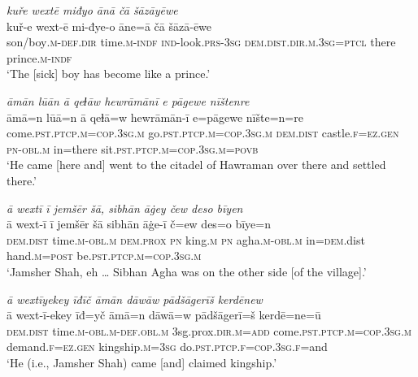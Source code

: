 \ea \label{DG.70}
\textit{kuře wextē miđyo ānā čā šāzāyēwe} \\ 
\gll kuř-e wext-ē mi-đye-o āne=ā čā šāzā-ēwe \\ 
 son/boy\textsc{.m}\textsc{-def}\textsc{.dir} time\textsc{.m}\textsc{-indf} \textsc{ind-}look\textsc{.prs}\textsc{-3sg} \textsc{dem.dist}\textsc{.dir}\textsc{.m}\textsc{.3sg}=\textsc{ptcl} there prince\textsc{.m}\textsc{-indf} \\ 
\glt `The [sick] boy has become like a prince.'
\z 
 
\ea \label{DP.9}
\textit{āmān lūān ā qeɫāw hewrāmānī e pāgewe nīštenre} \\ 
\gll āmā=n lūā=n ā qeɫā=w hewrāmān-ī e=pāgewe nīšte=n=re \\ 
 come\textsc{.pst}\textsc{.ptcp}\textsc{.m}\textsc{=cop}\textsc{.3sg}\textsc{.m} go\textsc{.pst}\textsc{.ptcp}\textsc{.m}\textsc{=cop}\textsc{.3sg}\textsc{.m} \textsc{dem.dist} castle\textsc{\textsc{.f}}\textsc{=ez}\textsc{.gen} \textsc{pn}\textsc{-obl}\textsc{.m} in=there sit\textsc{.pst}\textsc{.ptcp}\textsc{.m}\textsc{=cop}\textsc{.3sg}\textsc{.m}\textsc{=\textsc{povb}} \\ 
\glt `He came [here and] went to the citadel of Hawraman over there and settled there.'
\z 
 
\ea \label{DP.12}
\textit{ā wextī ī jemšēr šā, sibhān āġey čew deso bīyen} \\ 
\gll ā wext-ī ī jemšēr šā sibhān āġe-ī č=ew des=o bīye=n \\ 
 \textsc{dem.dist} time\textsc{.m}\textsc{-obl}\textsc{.m} \textsc{dem.prox} \textsc{pn} king\textsc{.m} \textsc{pn} agha\textsc{.m}\textsc{-obl}\textsc{.m} in\textsc{=dem}.dist hand\textsc{.m}\textsc{=\textsc{post}} be\textsc{.pst}\textsc{.ptcp}\textsc{.m}\textsc{=cop}\textsc{.3sg}\textsc{.m} \\ 
\glt `Jamsher Shah, eh … Sibhan Agha was on the other side [of the village].'
\z 
 
\ea \label{DP.17}
\textit{ā wextīyekey īđīč āmān dāwāw pādšāgerīš kerdēnew} \\ 
\gll ā wext-ī-ekey īđ=yč āmā=n dāwā=w pādšāgerī=š kerdē=ne=ū \\ 
 \textsc{dem.dist} time\textsc{.m}\textsc{-obl}\textsc{.m}\textsc{-def}\textsc{.obl}\textsc{.m} 3sg.prox\textsc{.dir}\textsc{.m}\textsc{=add} come\textsc{.pst}\textsc{.ptcp}\textsc{.m}\textsc{=cop}\textsc{.3sg}\textsc{.m} demand\textsc{\textsc{.f}}\textsc{=ez}\textsc{.gen} kingship\textsc{.m}\textsc{=3sg} do\textsc{.pst}\textsc{.ptcp}\textsc{\textsc{.f}}\textsc{=cop}\textsc{.3sg}\textsc{\textsc{.f}}=and \\ 
\glt `He (i.e., Jamsher Shah) came [and] claimed kingship.'
\z 
 
